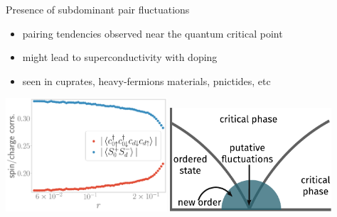 \documentclass[8pt,aspectratio=169]{beamer}
\newcommand{\nitem}{\item[\ding{51}]}
\begin{document}
\begin{frame}{Presence of subdominant pair fluctuations}
	
\begin{itemize}
	\nitem \alert{pairing tendencies} observed near the quantum critical point\\[10pt]
	\nitem might lead to \alert{superconductivity} with doping\\[10pt]
	\nitem seen in cuprates, heavy-fermions materials, pnictides, etc\\[10pt]
\end{itemize}
\includegraphics[width=0.45\textwidth]{odlro_d0.pdf}
\hspace*{\fill}
\includegraphics[width=0.45\textwidth]{gen-phase-diagram.pdf}
\end{frame}
\end{document}
